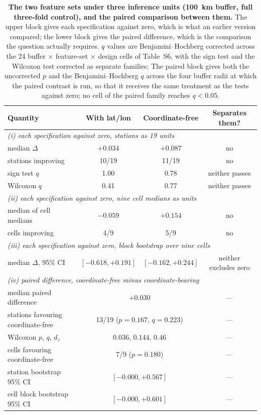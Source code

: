 \documentclass[11pt]{article}
\begin{document}
\begin{table}[htbp]\centering\footnotesize
\caption{\textbf{The two feature sets under three inference units (100~km buffer, full three-fold control), and the paired comparison between them.} The upper block gives each specification against zero, which is what an earlier version compared; the lower block gives the paired difference, which is the comparison the question actually requires. $q$ values are Benjamini--Hochberg corrected across the 24 buffer $\times$ feature-set $\times$ design cells of Table~S6, with the sign test and the Wilcoxon test corrected as separate families; The paired block gives both the uncorrected $p$ and the Benjamini--Hochberg $q$ across the four buffer radii at which the paired contrast is run, so that it receives the same treatment as the tests against zero; no cell of the paired family reaches $q<0.05$.}
\begin{tabular}{lccc}\toprule
Quantity & With lat/lon & Coordinate-free & Separates them? \\ \midrule
\multicolumn{4}{l}{\textit{(i) each specification against zero, stations as 19 units}} \\
median $\Delta$ & $+0.034$ & $+0.087$ & no \\
\quad stations improving & 10/19 & 11/19 & no \\
\quad sign test $q$ & 1.00 & 0.78 & neither passes \\
\quad Wilcoxon $q$ & 0.41 & 0.77 & neither passes \\
\multicolumn{4}{l}{\textit{(ii) each specification against zero, nine cell medians as units}} \\
median of cell medians & $-0.059$ & $+0.154$ & no \\
\quad cells improving & 4/9 & 5/9 & no \\
\multicolumn{4}{l}{\textit{(iii) each specification against zero, block bootstrap over nine cells}} \\
median $\Delta$, 95\% CI & $[-0.618,+0.191]$ & $[-0.162,+0.244]$ & neither excludes zero \\ \midrule
\multicolumn{4}{l}{\textit{(iv) paired difference, coordinate-free minus coordinate-bearing}} \\
median paired difference & \multicolumn{2}{c}{$+0.030$} & --- \\
\quad stations favouring coordinate-free & \multicolumn{2}{c}{13/19 ($p=0.167$, $q=0.223$)} & --- \\
\quad Wilcoxon $p$, $q$, $d_z$ & \multicolumn{2}{c}{$0.036$, \; $0.144$, \; $0.46$} & --- \\
\quad cells favouring coordinate-free & \multicolumn{2}{c}{7/9 ($p=0.180$)} & --- \\
\quad station bootstrap 95\% CI & \multicolumn{2}{c}{$[-0.000,+0.567]$} & --- \\
\quad cell block bootstrap 95\% CI & \multicolumn{2}{c}{$[-0.000,+0.601]$} & --- \\
\bottomrule\end{tabular}\end{table}
\end{document}
